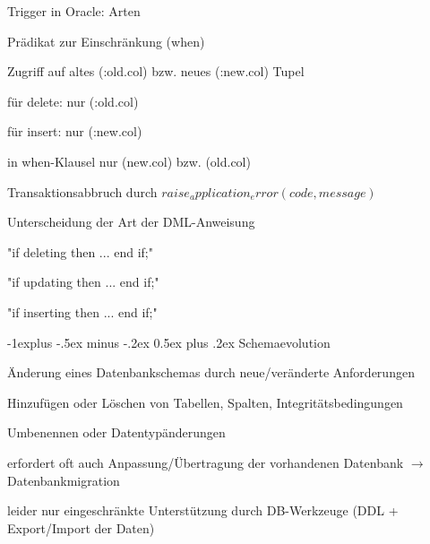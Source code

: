 \documentclass[a4paper]{article}
\makeatletter
\renewcommand{\subsection}{\@startsection{subsection}{2}{0mm}%
                                {-1explus -.5ex minus -.2ex}%
                                {0.5ex plus .2ex}%
                                {\normalfont\normalsize\bfseries}}
\makeatother
\begin{document}
\begin{multicols}{3}
\begin{itemize*}
    Trigger in Oracle: Arten
    \begin{itemize*}
        \item Prädikat zur Einschränkung (when)
        \item Zugriff auf altes (:old.col) bzw. neues (:new.col) Tupel
        \begin{itemize*}
            \item für delete: nur (:old.col)
            \item für insert: nur (:new.col)
            \item in when-Klausel nur (new.col) bzw. (old.col)
        \end{itemize*}
        \item Transaktionsabbruch durch $raise_application_error(code, message)$
        \item Unterscheidung der Art der DML-Anweisung
        \begin{itemize*}
            \item "if deleting then ... end if;"
            \item "if updating then ... end if;"
            \item "if inserting then ... end if;"
        \end{itemize*}
    \end{itemize*}

    \subsection{Schemaevolution}
    \begin{itemize*}
        \item Änderung eines Datenbankschemas durch neue/veränderte Anforderungen
        \begin{itemize*}
            \item Hinzufügen oder Löschen von Tabellen, Spalten, Integritätsbedingungen
            \item Umbenennen oder Datentypänderungen
        \end{itemize*}
        \item erfordert oft auch Anpassung/Übertragung der vorhandenen Datenbank $\rightarrow$ Datenbankmigration
        \item leider nur eingeschränkte Unterstützung durch DB-Werkzeuge (DDL + Export/Import der Daten)
    \end{itemize*}


\end{itemize*}
\end{multicols}
\end{document}
